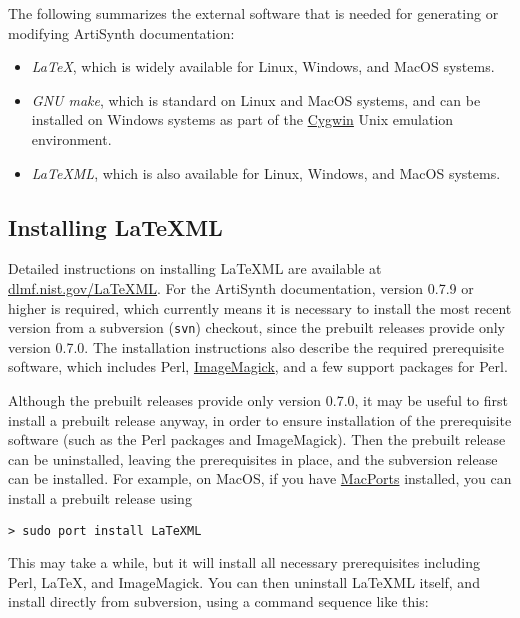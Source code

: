 \documentclass{article}
\begin{document}
The following summarizes the external software that
is needed for generating or modifying ArtiSynth
documentation:

\begin{itemize}

\item {\it LaTeX}, which is widely available for Linux, Windows,
and MacOS systems.

\item {\it GNU make}, which is standard on Linux and MacOS systems,
and can be installed on Windows systems as part of the 
\href{http://www.cygwin.com}{Cygwin} Unix emulation environment.

\item {\it LaTeXML}, which is also available for Linux, Windows, and
MacOS systems.  

\end{itemize}

\subsection{Installing LaTeXML}

Detailed instructions on installing LaTeXML are available at
\href{http://dlmf.nist.gov/LaTeXML/}{dlmf.nist.gov/LaTeXML}.  For the
ArtiSynth documentation, version 0.7.9 or higher is required, which
currently means it is necessary to install the most recent version
from a subversion ({\tt svn}) checkout, since the prebuilt releases
provide only version 0.7.0. The installation instructions also
describe the required prerequisite software, which includes Perl,
\href{http://www.imagemagick.org}{ImageMagick}, and a few support
packages for Perl.

Although the prebuilt releases provide only version 0.7.0, it may be
useful to first install a prebuilt release anyway, in order to ensure
installation of the prerequisite software (such as the Perl packages
and ImageMagick). Then the prebuilt release can be uninstalled,
leaving the prerequisites in place, and the subversion release can be
installed. For example, on MacOS, if you have 
\href{http://www.macports.org}{MacPorts} installed, 
you can install a prebuilt release
using 

\begin{lstlisting}[]
  > sudo port install LaTeXML
\end{lstlisting}

This may take a while, but it will install all necessary prerequisites
including Perl, LaTeX, and ImageMagick. You can then uninstall LaTeXML
itself, and install directly from subversion, using a command
sequence like this:
\end{document}
